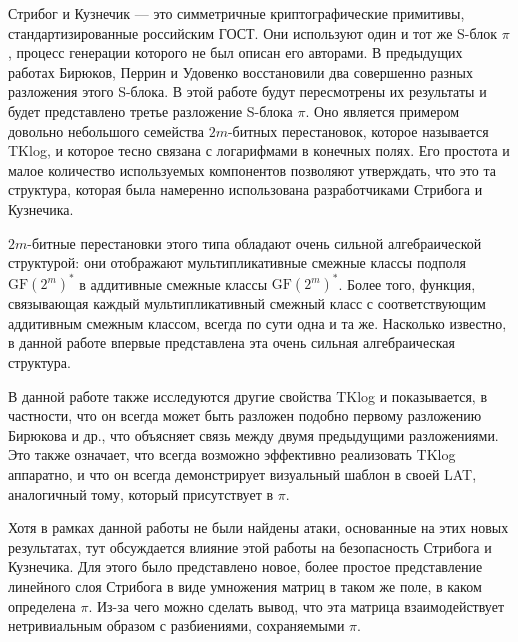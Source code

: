 \abstract

Стрибог и Кузнечик — это симметричные криптографические примитивы, стандартизированные российским ГОСТ. Они используют один и тот же S-блок \(\pi\), процесс генерации которого не был описан его авторами. В предыдущих работах Бирюков, Перрин и Удовенко восстановили два совершенно разных разложения этого S-блока. В этой работе будут пересмотрены их результаты и будет представлено третье разложение S-блока \(\pi\). Оно является примером довольно небольшого семейства \(2m\)-битных перестановок, которое называется TKlog, и которое тесно связана с логарифмами в конечных полях. Его простота и малое количество используемых компонентов позволяют утверждать, что это та структура, которая была намеренно использована разработчиками Стрибога и Кузнечика.

\(2m\)-битные перестановки этого типа обладают очень сильной алгебраической структурой: они отображают мультипликативные смежные классы подполя \(\text{GF}(2^m)^*\) в аддитивные смежные классы \(\text{GF}(2^m)^*\). Более того, функция, связывающая каждый мультипликативный смежный класс с соответствующим аддитивным смежным классом, всегда по сути одна и та же. Насколько известно, в данной работе впервые представлена эта очень сильная алгебраическая структура.

В данной работе также исследуются другие свойства TKlog и показывается, в частности, что он всегда может быть разложен подобно первому разложению Бирюкова и др., что объясняет связь между двумя предыдущими разложениями. Это также означает, что всегда возможно эффективно реализовать TKlog аппаратно, и что он всегда демонстрирует визуальный шаблон в своей LAT, аналогичный тому, который присутствует в \(\pi\).

Хотя в рамках данной работы не были найдены атаки, основанные на этих новых результатах, тут обсуждается влияние этой работы на безопасность Стрибога и Кузнечика. Для этого было представлено новое, более простое представление линейного слоя Стрибога в виде умножения матриц в таком же поле, в каком определена \(\pi\). Из-за чего можно сделать вывод, что эта матрица взаимодействует нетривиальным образом с разбиениями, сохраняемыми \(\pi\).
